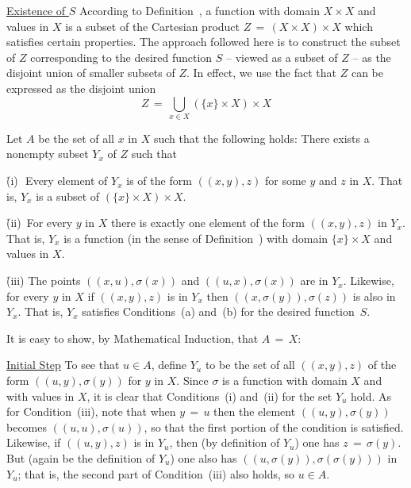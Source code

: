 \V

        \underline{Existence of $S$} According to Definition~, a function with domain $X{\times}X$ and values in $X$ is a subset of the
    Cartesian product $Z \,=\, (X{\times}X){\times}X$ which satisfies certain properties.
    The approach followed here is to construct the subset of $Z$ corresponding to the desired function $S$ -- viewed as a  subset of $Z$ --
    as the disjoint union of smaller subsets of $Z$. In effect, we use the fact that $Z$  can be expressed as the disjoint union
        \begin{displaymath}
        Z \,=\, {\bigcup}_{x{\in}X} \left(\{x\}{\times}X\right){\times}X
        \end{displaymath}

        Let $A$ be the set of all $x$ in $X$ such that the following holds:
    There exists a nonempty subset $Y_{x}$ of $Z$ such that

        \h (i)\,\, Every element of $Y_{x}$ is of the form $((x,y),z)$ for some $y$ and $z$ in $X$.
    That is, $Y_{x}$ is a subset of $\left(\{x\}{\times}X\right){\times}X$.

        \h (ii)\, For every $y$ in $X$ there is exactly one element of the form $((x,y),z)$ in $Y_{x}$.
    That is, $Y_{x}$ is a function (in the sense of Definition~) with domain $\{x\}{\times}X$ and values in $X$.

        \h (iii) The points $((x,u),{\sigma}(x))$ and $((u,x),{\sigma}(x))$ are in $Y_{x}$.
    Likewise, for every $y$ in $X$ if $((x,y),z)$ is in $Y_{x}$ then $((x,{\sigma}(y)),{\sigma}(z))$ is also in $Y_{x}$.
    That is, $Y_{x}$ satisfies Conditions~(a) and~(b) for the desired function~$S$.

\noindent It is easy to show, by Mathematical Induction, that $A \,=\, X$:


        \underline{Initial Step} To see that $u{\in}A$, define $Y_{u}$ to be the set of all $((x,y),z)$ of the form $((u,y),{\sigma}(y))$ for $y$ in $X$.
    Since ${\sigma}$ is a function with domain $X$ and with values in $X$, it is clear that Conditions~(i) and~(ii) for the set $Y_{u}$ hold.
    As for Condition~(iii), note that when $y \,=\, u$ then the element $((u,y),{\sigma}(y))$ becomes $((u,u),{\sigma}(u))$, so that the first portion of the condition is satisfied.
    Likewise, if $((u,y),z)$ is in $Y_{u}$, then (by definition of $Y_{u}$) one has $z \,=\, {\sigma}(y)$.
    But (again be the definition of $Y_{u}$) one also has $((u,{\sigma}(y)),{\sigma}({\sigma}(y)))$ in $Y_{u}$;
    that is, the second part of Condition~(iii) also holds, so $u{\in}A$.

